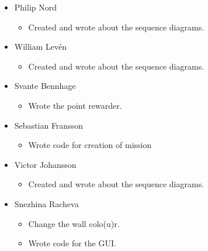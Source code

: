 \begin{itemize}
    \item Philip Nord 
       \begin{itemize}
           \item Created and wrote about the sequence diagrams.
       \end{itemize}
    \item William Lev\'{e}n
       \begin{itemize}
           \item Created and wrote about the sequence diagrams.
       \end{itemize}
    \item Svante Bennhage
       \begin{itemize}
           \item Wrote the point rewarder.
       \end{itemize}
    \item Sebastian Fransson
       \begin{itemize}
           \item Wrote code for creation of mission
       \end{itemize}
    \item Victor Johansson
       \begin{itemize}
           \item Created and wrote about the sequence diagrams.
       \end{itemize}
    \item Snezhina Racheva
       \begin{itemize}
           \item Change the wall colo(u)r.
           \item Wrote code for the GUI.
       \end{itemize}
\end{itemize}